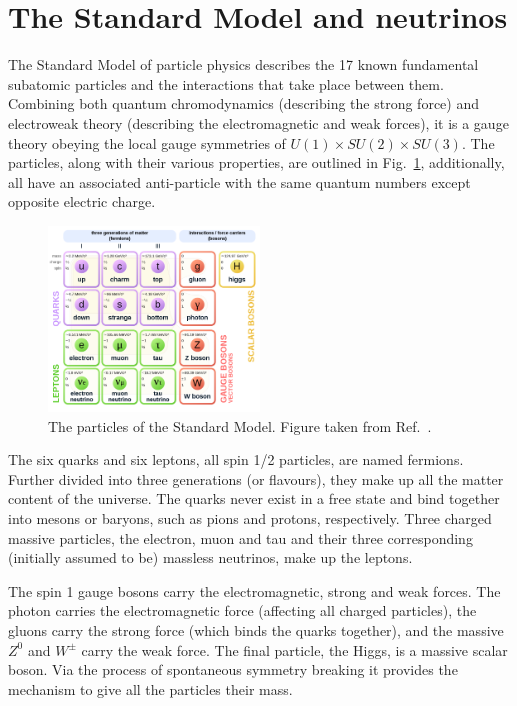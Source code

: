 \section{The Standard Model and neutrinos} %
\label{sec:theory_sm} %

The Standard Model of particle physics describes the 17 known fundamental subatomic particles and
the interactions that take place between them. Combining both quantum chromodynamics (describing
the strong force) and electroweak theory (describing the electromagnetic and weak forces), it is a
gauge theory obeying the local gauge symmetries of $U(1) \times SU(2) \times SU(3)$. The particles,
along with their various properties, are outlined in Fig.~\ref{fig:sm}, additionally, all have an
associated anti-particle with the same quantum numbers except opposite electric charge.

\begin{figure} %
    \includegraphics[origin=c,width=0.5\textwidth]{diagrams/3-theory/sm.png}
    \caption[The Standard Model particles]
    {The particles of the Standard Model. Figure taken from Ref.~\cite{wiki2020}.}
    \label{fig:sm}
\end{figure}

The six quarks and six leptons, all spin 1/2 particles, are named fermions. Further divided into
three generations (or flavours), they make up all the matter content of the universe. The quarks
never exist in a free state and bind together into mesons or baryons, such as pions and protons,
respectively.  Three charged massive particles, the electron, muon and tau and their three
corresponding (initially assumed to be) massless neutrinos, make up the leptons.

The spin 1 gauge bosons carry the electromagnetic, strong and weak forces. The photon carries the
electromagnetic force (affecting all charged particles), the gluons carry the strong force (which
binds the quarks together), and the massive $Z^{0}$ and $W^{\pm}$ carry the weak force. The final
particle, the Higgs, is a massive scalar boson. Via the process of spontaneous symmetry breaking
it provides the mechanism to give all the particles their mass.

